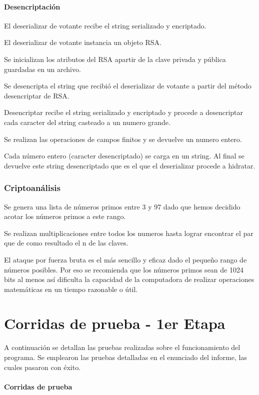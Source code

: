 \documentclass[a4paper,10pt]{article}
\begin{document}
\paragraph{Desencriptación}
El deserializar de votante recibe el string serializado y encriptado.

El deserializar de votante instancia un objeto RSA.

Se inicializan los atributos del RSA apartir de la clave privada y pública guardadas en un archivo.

Se desencripta el string que recibió el deserializar de votante a partir del método desencriptar de RSA.

Desencriptar recibe el string serializado y encriptado y procede a desencriptar cada caracter del string casteado a un numero grande.

Se realizan las operaciones de campos finitos y se devuelve un numero entero.

Cada número entero (caracter desencriptado) se carga en un string. Al final se devuelve este string desencriptado que es el que el deserializar procede a hidratar.



\subsubsection{Criptoanálisis}
Se genera una lista de números primos entre 3 y 97 dado que hemos decidido acotar los números primos a este rango.

Se realizan multiplicaciones entre todos los numeros hasta lograr encontrar el par que de como resultado el n de las claves.

El ataque por fuerza bruta es el más sencillo y eficaz dado el pequeño rango de números posibles. Por eso se recomienda que los números primos sean de 1024 bits al menos así dificulta la capacidad de la computadora de realizar operaciones matemáticas en un tiempo razonable o útil.

\newpage


\section{Corridas de prueba - 1er Etapa}

A continuación se detallan las pruebas realizadas sobre el funcionamiento del programa. Se emplearon las pruebas detalladas en el enunciado del informe, las cuales pasaron con éxito.

\paragraph{Corridas de prueba}
\end{document}
